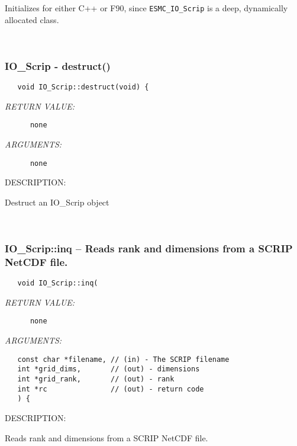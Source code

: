         Initializes for either C++ or F90, since {\tt ESMC\_IO\_Scrip} is a deep,
        dynamically allocated class.
   
 
\mbox{}\hrulefill\ 
 
\subsubsection [IO\_Scrip] {IO\_Scrip - destruct()}


  
\begin{verbatim}   void IO_Scrip::destruct(void) {\end{verbatim}{\em RETURN VALUE:}
\begin{verbatim}      none\end{verbatim}{\em ARGUMENTS:}
\begin{verbatim}      none\end{verbatim}
{\sf DESCRIPTION:\\ }


        Destruct an IO_Scrip object
   
 
\mbox{}\hrulefill\ 
 
\subsubsection [IO\_Scrip::inq] {IO\_Scrip::inq -- Reads rank and dimensions from a SCRIP NetCDF file.}


  
\begin{verbatim}   void IO_Scrip::inq(\end{verbatim}{\em RETURN VALUE:}
\begin{verbatim}      none\end{verbatim}{\em ARGUMENTS:}
\begin{verbatim}   const char *filename, // (in) - The SCRIP filename
   int *grid_dims,       // (out) - dimensions
   int *grid_rank,       // (out) - rank
   int *rc               // (out) - return code
   ) {\end{verbatim}
{\sf DESCRIPTION:\\ }


        Reads rank and dimensions from a SCRIP NetCDF file.
  
\setlength{\parskip}{\oldparskip}
\setlength{\parindent}{\oldparindent}
\setlength{\baselineskip}{\oldbaselineskip}
